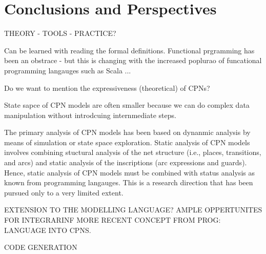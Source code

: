 \section{Conclusions and Perspectives}

THEORY - TOOLS - PRACTICE?

Can be learned with reading the formal definitions. Functional prgramming has been an obstrace - but this is changing with the increased poplurao of funcational programming langauges such as Scala ...

Do we want to mention the expressiveness (theoretical) of CPNs?

State sapce of CPN models are often smaller because we can do complex data manipulation without introdcuing internmediate steps.


The primary analysis of CPN models has been based on dynanmic analysis
by means of simulation or state space exploration. Static analysis of
CPN models involves combining stuctural analysis of the net structure
(i.e., places, transitions, and arcs) and static analysis of the
inscriptions (arc expressions and guards). Hence, static analysis of
CPN models must be combined with status analysis as known from
programming langauges. This is a research direction that has been
pursued only to a very limited extent.

EXTENSION TO THE MODELLING LANGUAGE? AMPLE OPPERTUNITES FOR
INTEGRARINF MORE RECENT CONCEPT FROM PROG: LANGUAGE INTO CPNS.

CODE GENERATION
